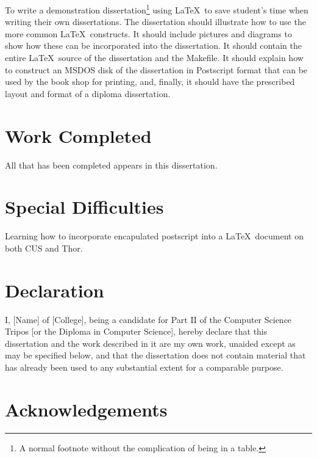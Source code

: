 \documentclass[12pt,twoside,notitlepage]{report}
\begin{document}
To write a demonstration dissertation\footnote{A normal footnote without the
complication of being in a table.} using \LaTeX\ to save
student's time when writing their own dissertations. The dissertation
should illustrate how to use the more common \LaTeX\ constructs. It
should include pictures and diagrams to show how these can be
incorporated into the dissertation.  It should contain the entire
\LaTeX\ source of the dissertation and the Makefile.  It should
explain how to construct an MSDOS disk of the dissertation in
Postscript format that can be used by the book shop for printing, and,
finally, it should have the prescribed layout and format of a diploma
dissertation.


\section*{Work Completed}

All that has been completed appears in this dissertation.

\section*{Special Difficulties}

Learning how to incorporate encapulated postscript into a \LaTeX\
document on both CUS and Thor.
 
\newpage
\section*{Declaration}

I, [Name] of [College], being a candidate for Part II of the Computer
Science Tripos [or the Diploma in Computer Science], hereby declare
that this dissertation and the work described in it are my own work,
unaided except as may be specified below, and that the dissertation
does not contain material that has already been used to any substantial
extent for a comparable purpose.

\bigskip
{}

\medskip
{}

\cleardoublepage

\tableofcontents

\listoffigures

\newpage
\section*{Acknowledgements}
\end{document}
